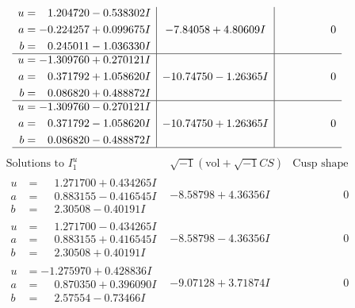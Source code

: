 \documentclass[1p]{elsarticle_modified}
\theoremstyle{definition}
\newcommand{\I}{\sqrt{-1}}
\begin{document}
$$\begin{array}{c|c|c}
\begin{aligned}
u &= \phantom{-}1.204720 - 0.538302 I \\
a &= -0.224257 + 0.099675 I \\
b &= \phantom{-}0.245011 - 1.036330 I\end{aligned}
 & -7.84058 + 4.80609 I & \phantom{-0.000000 } 0 \\ \hline\begin{aligned}
u &= -1.309760 + 0.270121 I \\
a &= \phantom{-}0.371792 + 1.058620 I \\
b &= \phantom{-}0.086820 + 0.488872 I\end{aligned}
 & -10.74750 - 1.26365 I & \phantom{-0.000000 } 0 \\ \hline\begin{aligned}
u &= -1.309760 - 0.270121 I \\
a &= \phantom{-}0.371792 - 1.058620 I \\
b &= \phantom{-}0.086820 - 0.488872 I\end{aligned}
 & -10.74750 + 1.26365 I & \phantom{-0.000000 } 0\\
 \hline 
 \end{array}$$\newpage$$\begin{array}{c|c|c}  
\text{Solutions to }I^u_{1}& \I (\text{vol} + \sqrt{-1}CS) & \text{Cusp shape}\\
 \hline 
\begin{aligned}
u &= \phantom{-}1.271700 + 0.434265 I \\
a &= \phantom{-}0.883155 - 0.416545 I \\
b &= \phantom{-}2.30508 - 0.40191 I\end{aligned}
 & -8.58798 + 4.36356 I & \phantom{-0.000000 } 0 \\ \hline\begin{aligned}
u &= \phantom{-}1.271700 - 0.434265 I \\
a &= \phantom{-}0.883155 + 0.416545 I \\
b &= \phantom{-}2.30508 + 0.40191 I\end{aligned}
 & -8.58798 - 4.36356 I & \phantom{-0.000000 } 0 \\ \hline\begin{aligned}
u &= -1.275970 + 0.428836 I \\
a &= \phantom{-}0.870350 + 0.396090 I \\
b &= \phantom{-}2.57554 - 0.73466 I\end{aligned}
 & -9.07128 + 3.71874 I & \phantom{-0.000000 } 0 \\ \hline\begin{aligned}

\end{aligned}
\end{array}$$
\end{document}
